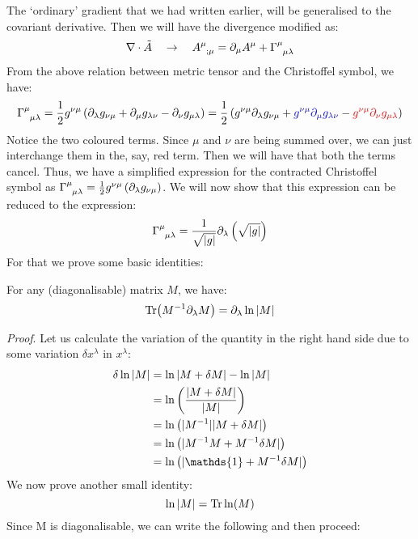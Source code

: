 The `ordinary' gradient that we had written earlier, will be generalised to the covariant derivative. Then we will have the divergence modified as: 
\begin{align*}
    \nabla \cdot \tilde{A}\quad \rightarrow \quad \tensor{A}{^\mu _{; \mu}} = \partial_\mu A^\mu + \tensor{\Gamma}{^\mu _{\mu \lambda}}
\end{align*}
From the above relation between metric tensor and the Christoffel symbol, we have:
\begin{align*}
    \tensor{\Gamma}{^\mu _{\mu \lambda}} = \frac{1}{2}g^{\nu \mu}\brac{\partial_\lambda g_{\nu \mu}+\partial_\mu g_{\lambda \nu}-\partial_\nu g_{\mu \lambda}} = \frac{1}{2}\brac{{g^{\nu \mu}\partial_\lambda g_{\nu \mu}}+\mathcolor{blue}{g^{\nu \mu}\partial_\mu g_{\lambda \nu}}-\mathcolor{red}{g^{\nu \mu}\partial_\nu g_{\mu \lambda}}}
\end{align*}
Notice the two coloured terms. Since $\mu$ and $\nu$ are being summed over, we can just interchange them in the, say, red term. Then we will have that both the terms cancel. Thus, we have a simplified expression for the contracted Christoffel symbol as $\tensor{\Gamma}{^\mu _{\mu \lambda}} = \frac{1}{2}g^{\nu \mu}\brac{\partial_\lambda g_{\nu \mu}}$. We will now show that this expression can be reduced to the expression:
$$\tensor{\Gamma}{^\mu _{\mu \lambda}} = \frac{1}{\sqrt{|g|}}\partial_\lambda \brac{\sqrt{|g|}}$$
For that we prove some basic identities:
\begin{identity}
    For any (diagonalisable) matrix $M$, we have:
    $$\Tr (M^{-1}\partial_\lambda M) = \partial_\lambda \ln |M|$$
\end{identity}
\textit{Proof}. Let us calculate the variation of the quantity in the right hand side due to some variation $\delta x^\lambda$ in $x^\lambda$:
\begin{align*}
    \delta \ln |M| &= \ln |M+\delta M| - \ln |M| \\
    &= \ln \brac{\frac{|M+\delta M|}{|M|}} \\
    &= \ln \brac{|M^{-1}||M+\delta M|}\\
    &=\ln \brac{|M^{-1}M + M^{-1}\delta M|}\\
    &=\ln \brac{|\mathds{1}+  M^{-1}\delta M|}
\end{align*}
We now prove another small identity:
$$\ln |M| = \Tr \ln (M)$$
Since M is diagonalisable, we can write the following and then proceed:
